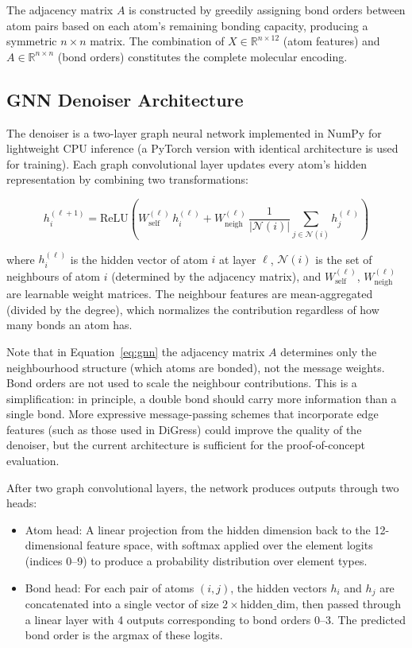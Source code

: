 \documentclass[11pt]{article}
\begin{document}
The adjacency matrix $A$ is constructed by greedily assigning bond
orders between atom pairs based on each atom's remaining bonding
capacity, producing a symmetric $n \times n$ matrix. The combination of
$X \in \mathbb{R}^{n \times 12}$ (atom features) and
$A \in \mathbb{R}^{n \times n}$ (bond orders) constitutes the complete
molecular encoding.

\subsection{GNN Denoiser Architecture}

The denoiser is a two-layer graph neural network implemented in NumPy
for lightweight CPU inference (a PyTorch version with identical
architecture is used for training). Each graph convolutional layer
updates every atom's hidden representation by combining two
transformations:

\begin{equation}
h_i^{(\ell+1)} = \text{ReLU}\!\left(
  W_{\text{self}}^{(\ell)}\, h_i^{(\ell)}
  + W_{\text{neigh}}^{(\ell)}\, \frac{1}{|\mathcal{N}(i)|}
    \sum_{j \in \mathcal{N}(i)} h_j^{(\ell)}
\right)
\label{eq:gnn}
\end{equation}

\noindent
where $h_i^{(\ell)}$ is the hidden vector of atom $i$ at layer $\ell$,
$\mathcal{N}(i)$ is the set of neighbours of atom $i$ (determined by the
adjacency matrix), and $W_{\text{self}}^{(\ell)}$,
$W_{\text{neigh}}^{(\ell)}$ are learnable weight matrices. The
neighbour features are mean-aggregated (divided by the degree), which
normalizes the contribution regardless of how many bonds an atom has.

Note that in Equation~\ref{eq:gnn} the adjacency matrix $A$ determines
only the neighbourhood structure (which atoms are bonded), not the
message weights. Bond orders are not used to scale the neighbour
contributions. This is a simplification: in principle, a double bond
should carry more information than a single bond. More expressive
message-passing schemes that incorporate edge features (such as those
used in DiGress) could improve the quality of
the denoiser, but the current architecture is sufficient for the
proof-of-concept evaluation.

After two graph convolutional layers, the network produces outputs
through two heads:

\begin{itemize}[nosep]
  \item Atom head: A linear projection from the hidden dimension back to
        the 12-dimensional feature space, with softmax applied over the
        element logits (indices 0--9) to produce a probability
        distribution over element types.
  \item Bond head: For each pair of atoms $(i, j)$, the hidden vectors
        $h_i$ and $h_j$ are concatenated into a single vector of size
        $2 \times \text{hidden\_dim}$, then passed through a linear layer
        with 4 outputs corresponding to bond orders 0--3. The predicted
        bond order is the argmax of these logits.
\end{itemize}
\end{document}
